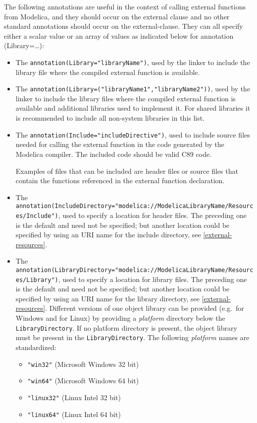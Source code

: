 The following annotations are useful in the context of calling external
functions from Modelica, and they should occur on the external clause
and no other standard annotations should occur on the external-clause.
They can all specify either a scalar value or an array of values as
indicated below for annotation (Library=\ldots{}):
\begin{itemize}
\item
  The \lstinline!annotation(Library="libraryName")!, used by the linker to include
  the library file where the compiled external function is available.
\item
  The \lstinline!annotation(Library=("libraryName1","libraryName2"))!, used by the
  linker to include the library files where the compiled external
  function is available and additional libraries used to implement it.
  For shared libraries it is recommended to include all non-system
  libraries in this list.
\item
  The \lstinline!annotation(Include="includeDirective")!, used to include source files needed for calling the external function in the code
  generated by the Modelica compiler. The included code should be valid C89 code.
  \begin{nonnormative}
  Examples of files that can be included are header files or source files that contain the
  functions referenced in the external function declaration.
  \end{nonnormative}
\item
  The
  \lstinline!annotation(IncludeDirectory="modelica://ModelicaLibraryName/Resources/Include")!,
  used to specify a location for header files. The preceding one is the
  default and need not be specified; but another location could be
  specified by using an URI name for the include directory, see \cref{external-resources}.
\item
  The
  \lstinline!annotation(LibraryDirectory="modelica://ModelicaLibraryName/Resources/Library")!,
  used to specify a location for library files. The preceding one is the
  default and need not be specified; but another location could be
  specified by using an URI name for the library directory, see \cref{external-resources}.
  Different versions of one object library can be provided
  (e.g.\ for Windows and for Linux) by providing a
  \emph{platform} directory below the \lstinline!LibraryDirectory!. If no
  platform directory is present, the object library must be present
  in the \lstinline!LibraryDirectory!. The following \emph{platform} names are
  standardized:
  \begin{itemize}
  \item
    \lstinline!"win32"! (Microsoft Windows 32 bit)
  \item
    \lstinline!"win64"! (Microsoft Windows 64 bit)
  \item
    \lstinline!"linux32"! (Linux Intel 32 bit)
  \item
    \lstinline!"linux64"! (Linux Intel 64 bit)
  \end{itemize}
\end{itemize}

